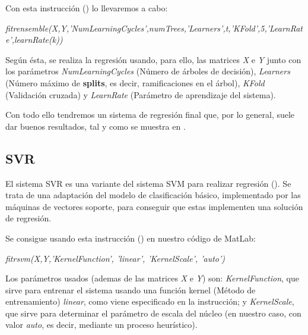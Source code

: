 Con esta instrucción (\cite{fitrensemble}) lo llevaremos a cabo:

\begin{center}
\textit{fitrensemble(X,Y,'NumLearningCycles',numTrees,'Learners',t,'KFold',5,'LearnRate',learnRate(k))}
\end{center}

Según ésta, se realiza la regresión usando, para ello, las matrices \textit{X} e \textit{Y} junto con los parámetros \textit{NumLearningCycles} (Número de árboles de decisión), \textit{Learners} (Número máximo de \textbf{splits}, es decir, ramificaciones en el árbol), \textit{KFold} (Validación cruzada) y \textit{LearnRate} (Parámetro de aprendizaje del sistema).

Con todo ello tendremos un sistema de regresión final que, por lo general, suele dar buenos resultados, tal y como se muestra en \cite{isa2}.

\subsection{SVR}

El sistema \ac{SVR} es una variante del sistema \ac{SVM} para realizar regresión (\cite{SVR}). Se trata de una adaptación del modelo de clasificación básico, implementado por las máquinas de vectores soporte, para conseguir que estas implementen una solución de regresión.

Se consigue usando esta instrucción (\cite{fitrsvm}) en nuestro código de MatLab:

\begin{center}
\textit{fitrsvm(X,Y,'KernelFunction', 'linear', 'KernelScale', 'auto')}
\end{center}

Los parámetros usados (ademas de las matrices \textit{X} e \textit{Y}) son: \textit{KernelFunction}, que sirve para entrenar el sistema usando una función kernel (Método de entrenamiento) \textit{linear}, como viene especificado en la instrucción; y \textit{KernelScale}, que sirve para determinar el parámetro de escala del núcleo (en nuestro caso, con valor \textit{auto}, es decir, mediante un proceso heurístico).



